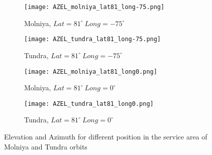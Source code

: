 \begin{figure}[ht]\ContinuedFloat
	\begin{subfigure}{.5\textwidth}
	\centering
	\texttt{[image: AZEL\_molniya\_lat81\_long-75.png]}
	\caption{Molniya, $Lat = 81^\circ ~ Long = -75^\circ$}
	\end{subfigure}
	\begin{subfigure}{.5\textwidth}
	\centering
	\texttt{[image: AZEL\_tundra\_lat81\_long-75.png]}
	\caption{Tundra, $Lat = 81^\circ ~ Long = -75^\circ$}
	\end{subfigure}
	\vspace{0.5cm}
	\begin{subfigure}{.5\textwidth}
	\centering
	\texttt{[image: AZEL\_molniya\_lat81\_long0.png]}
	\caption{Molniya, $Lat = 81^\circ ~ Long = 0^\circ$}
	\end{subfigure}
	\begin{subfigure}{.5\textwidth}
	\centering
	\texttt{[image: AZEL\_tundra\_lat81\_long0.png]}
	\caption{Tundra, $Lat = 81^\circ ~ Long = 0^\circ$}
	\end{subfigure}
	\caption{Elevation and Azimuth for different position in the service area of Molniya and Tundra orbits}
	\label{fig:elevation_multi}
\end{figure}
